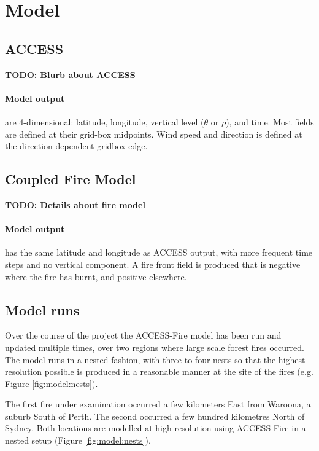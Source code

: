 \section{Model} 
  \label{model}

  \subsection{ACCESS}  
    \textbf{TODO: Blurb about ACCESS}
    
    \paragraph{Model output} are 4-dimensional: latitude, longitude, vertical level ($\theta$ or $\rho$), and time. Most fields are defined at their grid-box midpoints. Wind speed and direction is defined at the direction-dependent gridbox edge.
    
    
  \subsection{Coupled Fire Model}
    \textbf{TODO: Details about fire model}
    
    \paragraph{Model output} has the same latitude and longitude as ACCESS output, with more frequent time steps and no vertical component.
    A fire front field is produced that is negative where the fire has burnt, and positive elsewhere.
    
  
  
  
  \subsection{Model runs}
    \label{model:runs}
    Over the course of the project the ACCESS-Fire model has been run and updated multiple times, over two regions where large scale forest fires occurred.
    The model runs in a nested fashion, with three to four nests so that the highest resolution possible is produced in a reasonable manner at the site of the fires (e.g. Figure \ref{fig:model:nests}).
    
    The first fire under examination occurred a few kilometers East from Waroona, a suburb South of Perth.
    The second occurred a few hundred kilometres North of Sydney. 
    Both locations are modelled at high resolution using ACCESS-Fire in a nested setup (Figure \ref{fig:model:nests}).
    
